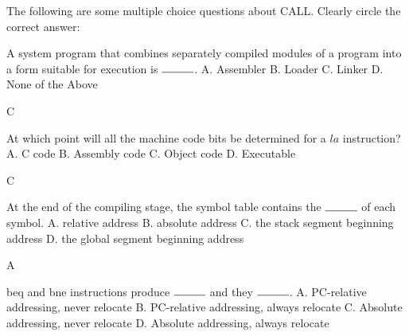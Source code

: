 \begin{blocksection}
\question The following are some multiple choice questions about CALL. Clearly circle the correct answer: 

\begin{parts}
\item 
A system program that combines separately compiled modules of a program into a form suitable for execution is $\rule{1cm}{0.15mm}$. \newline
A. Assembler \newline
B. Loader \newline
C. Linker \newline
D. None of the Above 

\begin{solution}
    C
\end{solution}

\item
At which point will all the machine code bits be determined for a $la$ instruction? \newline
A. C code \newline
B. Assembly code \newline
C. Object code \newline
D. Executable 

\begin{solution}
    C
\end{solution}

\item
At the end of the compiling stage, the symbol table contains the $\rule{1cm}{0.15mm}$ of each symbol. \newline
A. relative address \newline
B. absolute address \newline
C. the stack segment beginning address \newline
D. the global segment beginning address 

\begin{solution}
    A
\end{solution}

\item
beq and bne instructions produce $\rule{1cm}{0.15mm}$ and they $\rule{1cm}{0.15mm}$. \newline
A. PC-relative addressing, never relocate \newline
B. PC-relative addressing, always relocate \newline
C. Absolute addressing, never relocate \newline
D. Absolute addressing, always relocate 


\end{parts}
\end{blocksection}
